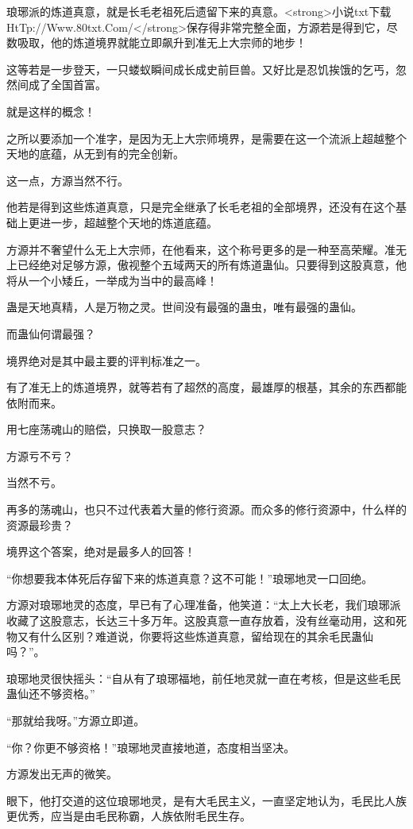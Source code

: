 \begin{this_body}
琅琊派的炼道真意，就是长毛老祖死后遗留下来的真意。<strong>小说txt下载HtTp://Www.80txt.Com/</strong>保存得非常完整全面，方源若是得到它，尽数吸取，他的炼道境界就能立即飙升到准无上大宗师的地步！

这等若是一步登天，一只蝼蚁瞬间成长成史前巨兽。又好比是忍饥挨饿的乞丐，忽然间成了全国首富。

就是这样的概念！

之所以要添加一个准字，是因为无上大宗师境界，是需要在这一个流派上超越整个天地的底蕴，从无到有的完全创新。

这一点，方源当然不行。

他若是得到这些炼道真意，只是完全继承了长毛老祖的全部境界，还没有在这个基础上更进一步，超越整个天地的炼道底蕴。

方源并不奢望什么无上大宗师，在他看来，这个称号更多的是一种至高荣耀。准无上已经绝对足够方源，傲视整个五域两天的所有炼道蛊仙。只要得到这股真意，他将从一个小矮丘，一举成为当中的最高峰！

蛊是天地真精，人是万物之灵。世间没有最强的蛊虫，唯有最强的蛊仙。

而蛊仙何谓最强？

境界绝对是其中最主要的评判标准之一。

有了准无上的炼道境界，就等若有了超然的高度，最雄厚的根基，其余的东西都能依附而来。

用七座荡魂山的赔偿，只换取一股意志？

方源亏不亏？

当然不亏。

再多的荡魂山，也只不过代表着大量的修行资源。而众多的修行资源中，什么样的资源最珍贵？

境界这个答案，绝对是最多人的回答！

“你想要我本体死后存留下来的炼道真意？这不可能！”琅琊地灵一口回绝。

方源对琅琊地灵的态度，早已有了心理准备，他笑道：“太上大长老，我们琅琊派收藏了这股意志，长达三十多万年。这股真意一直存放着，没有丝毫动用，这和死物又有什么区别？难道说，你要将这些炼道真意，留给现在的其余毛民蛊仙吗？”。

琅琊地灵很快摇头：“自从有了琅琊福地，前任地灵就一直在考核，但是这些毛民蛊仙还不够资格。”

“那就给我呀。”方源立即道。

“你？你更不够资格！”琅琊地灵直接地道，态度相当坚决。

方源发出无声的微笑。

眼下，他打交道的这位琅琊地灵，是有大毛民主义，一直坚定地认为，毛民比人族更优秀，应当是由毛民称霸，人族依附毛民生存。


\end{this_body}
